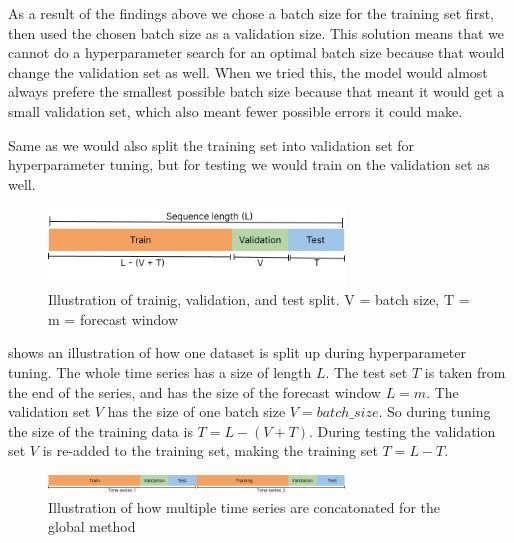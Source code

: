 As a result of the findings above we chose a batch size for the training set first, then
used the chosen batch size as a validation size.
This solution means that we cannot do a hyperparameter search for an optimal batch size
because that would change the validation set as well. When we tried this, the model would
almost always prefere the smallest possible batch size because that meant it would get a
small validation set, which also meant fewer possible errors it could make.

Same as \cite[]{Hewamalage2021} we would also split the training set into validation set for
hyperparameter tuning, but for testing we would train on the validation set as well.



\begin{figure}[h!]
  \centering
  \includegraphics[width=0.7\textwidth]{./figs/illustrations/illustration_train_val_test_split.png}
  \hfill
  \caption{Illustration of trainig, validation, and test split. V = batch size, T = m = forecast window}
  \label{fig:train-val-test-split}
\end{figure}

 shows an illustration of how one dataset is split up during
hyperparameter tuning.
The whole time series has a size of length $L$. The test set $T$ is taken from the end of the series,
and has the size of the forecast window $L = m$. The validation set $V$ has the size of
one batch size $V=batch\_size$. So during tuning the size of the training data is
$T = L - (V + T)$. During testing the validation set $V$ is re-added to the training set,
making the training set $T = L - T$.

\begin{figure}[h!]
  \centering
  \includegraphics[width=0.7\textwidth]{./figs/illustrations/illustration_global_time_series.png}
  \hfill
  \caption{Illustration of how multiple time series are concatonated for the global method}
  \label{fig:global-time-series}
\end{figure}






